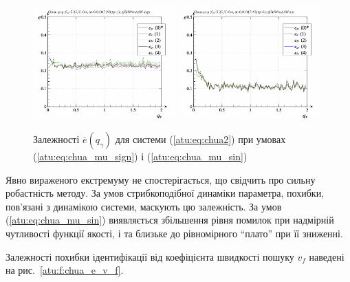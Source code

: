 \begin{figure}[htb!]
  \centerline{
    \includegraphics[width=0.49\textwidth]{p/cha/chua/ql3rlWvnAAW/chua_id-p_q_gamma_sign.png}
    \hfill
    \includegraphics[width=0.49\textwidth]{p/cha/chua/ql3rlWvnAAW/chua_id-p_q_gamma_sin.png}
  }
\caption{Залежності $ \overline{e} (q_\gamma) $ для системи (\ref{atu:eq:chua2}) при умовах (\ref{atu:eq:chua_mu_sign}) і (\ref{atu:eq:chua_mu_sin})
}
\label{atu:f:chua_e_qgamma}
\end{figure}

Явно вираженого екстремуму не спостерігається, що свідчить про
сильну робастність методу. За умов стрибкоподібної динаміки
параметра, похибки, пов'язані з динамікою системи, маскують
цю залежність. За умов (\ref{atu:eq:chua_mu_sin}) виявляється збільшення
рівня помилок при надмірній чутливості функції якості, і та
близьке до рівномірного ``плато'' при її зниженні.

Залежності похибки ідентифікації від коефіцієнта швидкості пошуку
$ v_f $ наведені на рис.~\ref{atu:f:chua_e_v_f}.

